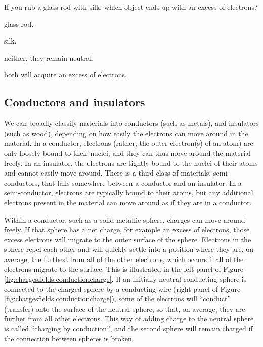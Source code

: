 \begin{checkpoint}\label{cp:chargesfields:tribo}
\begin{MCquestion}{If you rub a glass rod with silk, which object ends up with an excess of electrons?}
\item glass rod.
\item silk. \correct
\item neither, they remain neutral.
\item both will acquire an excess of electrons.
\end{MCquestion}
\end{checkpoint}

\subsection{Conductors and insulators}
We can broadly classify materials into conductors (such as metals), and insulators (such as wood), depending on how easily the electrons can move around in the material. In a conductor, electrons (rather, the outer electron(s) of an atom) are only loosely bound to their nuclei, and they can thus move around the material freely. In an insulator, the electrons are tightly bound to the nuclei of their atoms and cannot easily move around. There is a third class of materials, semi-conductors, that falls somewhere between a conductor and an insulator. In a semi-conductor, electrons are typically bound to their atoms, but any additional electrons present in the material can move around as if they are in a conductor. 

Within a conductor, such as a solid metallic sphere, charges can move around freely. If that sphere has a net charge, for example an excess of electrons, those excess electrons will migrate to the outer surface of the sphere. Electrons in the sphere repel each other and will quickly settle into a position where they are, on average, the furthest from all of the other electrons, which occurs if all of the electrons migrate to the surface. This is illustrated in the left panel of Figure \ref{fig:chargesfields:conductioncharge}. If an initially neutral conducting sphere is connected to the charged sphere by a conducting wire (right panel of Figure \ref{fig:chargesfields:conductioncharge}), some of the electrons will ``conduct'' (transfer) onto the surface of the neutral sphere, so that, on average, they are further from all other electrons. This way of adding charge to the neutral sphere is called ``charging by conduction'', and the second sphere will remain charged if the connection between spheres is broken.

